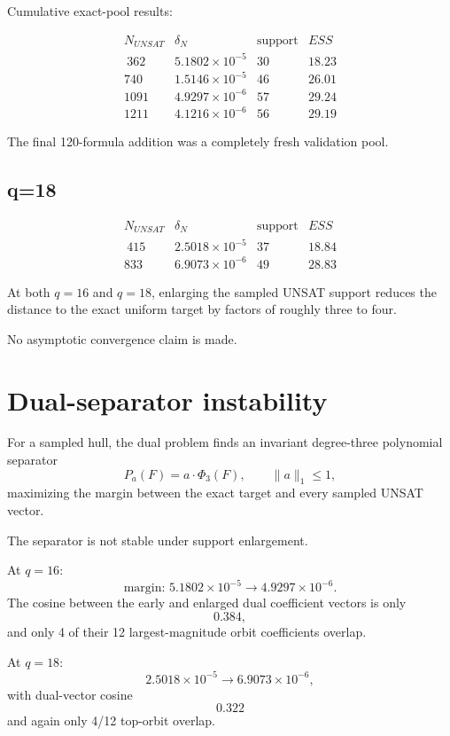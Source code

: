 \documentclass[11pt]{article}
\begin{document}
Cumulative exact-pool results:

\[
\begin{array}{c|c|c|c}
N_{UNSAT} & \delta_N & \text{support} & ESS \\\
\hline
362  & 5.1802\times10^{-5} & 30 & 18.23 \\
740  & 1.5146\times10^{-5} & 46 & 26.01 \\
1091 & 4.9297\times10^{-6} & 57 & 29.24 \\
1211 & 4.1216\times10^{-6} & 56 & 29.19
\end{array}
\]

The final 120-formula addition was a completely fresh validation pool.

\subsection*{q=18}

\[
\begin{array}{c|c|c|c}
N_{UNSAT} & \delta_N & \text{support} & ESS \\\
\hline
415 & 2.5018\times10^{-5} & 37 & 18.84 \\
833 & 6.9073\times10^{-6} & 49 & 28.83
\end{array}
\]

At both \(q=16\) and \(q=18\), enlarging the sampled UNSAT support reduces the
distance to the exact uniform target by factors of roughly three to four.

No asymptotic convergence claim is made.

\section{Dual-separator instability}

For a sampled hull, the dual problem finds an invariant degree-three
polynomial separator
\[
P_a(F)=a\cdot\Phi_3(F),
\qquad
\|a\|_1\le1,
\]
maximizing the margin between the exact target and every sampled UNSAT vector.

The separator is not stable under support enlargement.

At \(q=16\):
\[
\text{margin: }
5.1802\times10^{-5}
\longrightarrow
4.9297\times10^{-6}.
\]
The cosine between the early and enlarged dual coefficient vectors is only
\[
0.384,
\]
and only 4 of their 12 largest-magnitude orbit coefficients overlap.

At \(q=18\):
\[
2.5018\times10^{-5}
\longrightarrow
6.9073\times10^{-6},
\]
with dual-vector cosine
\[
0.322
\]
and again only 4/12 top-orbit overlap.
\end{document}
